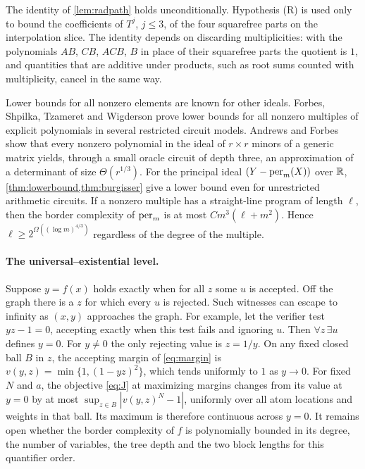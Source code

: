 The identity of \cref{lem:radpath} holds unconditionally. Hypothesis \textup{(R)} is used only to bound the coefficients of $T^j$, $j\le3$, of the four squarefree parts on the interpolation slice. The identity depends on discarding multiplicities: with the polynomials $AB$, $CB$, $ACB$, $B$ in place of their squarefree parts the quotient is $1$, and quantities that are additive under products, such as root sums counted with multiplicity, cancel in the same way.

Lower bounds for all nonzero elements are known for other ideals. Forbes, Shpilka, Tzameret and Wigderson \cite{FSTW16} prove lower bounds for all nonzero multiples of explicit polynomials in several restricted circuit models. Andrews and Forbes \cite{AF22} show that every nonzero polynomial in the ideal of $r\times r$ minors of a generic matrix yields, through a small oracle circuit of depth three, an approximation of a determinant of size $\Theta(r^{1/3})$. For the principal ideal $(Y-\operatorname{per}_m(X))$ over $\mathbb{R}$, \cref{thm:lowerbound,thm:burgisser} give a lower bound even for unrestricted arithmetic circuits. If a nonzero multiple has a straight-line program of length $\ell$, then the border complexity of $\operatorname{per}_m$ is at most $Cm^3(\ell+m^2)$. Hence $\ell\ge 2^{\Omega((\log m)^{4/3})}$ regardless of the degree of the multiple.

\paragraph{The universal--existential level.} Suppose $y=f(x)$ holds exactly when for all $z$ some $u$ is accepted. Off the graph there is a $z$ for which every $u$ is rejected. Such witnesses can escape to infinity as $(x,y)$ approaches the graph. For example, let the verifier test $yz-1=0$, accepting exactly when this test fails and ignoring $u$. Then $\forall z\,\exists u$ defines $y=0$. For $y\ne0$ the only rejecting value is $z=1/y$. On any fixed closed ball $B$ in $z$, the accepting margin of \eqref{eq:margin} is $v(y,z)=\min\{1,(1-yz)^2\}$, which tends uniformly to $1$ as $y\to0$. For fixed $N$ and $a$, the objective \eqref{eq:J} at maximizing margins changes from its value at $y=0$ by at most $\sup_{z\in B}|v(y,z)^N-1|$, uniformly over all atom locations and weights in that ball. Its maximum is therefore continuous across $y=0$. It remains open whether the border complexity of $f$ is polynomially bounded in its degree, the number of variables, the tree depth and the two block lengths for this quantifier order.

